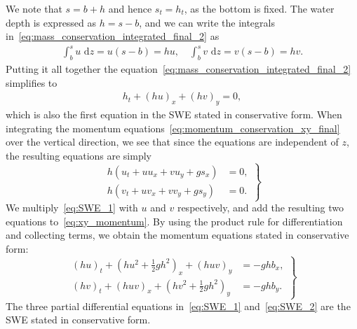 We note that $s = b + h$ and hence $s_t = h_t$, as the bottom is fixed.
The water depth is expressed as $h = s - b$, and we can write the integrals in~\eqref{eq:mass_conservation_integrated_final_2} as
\begin{align*}
    \int_{b}^{s} u \text{ d} z = u(s - b) = hu, \quad \int_{b}^{s} v \text{ d} z = v(s - b) = hv.
\end{align*}
Putting it all together the equation~\eqref{eq:mass_conservation_integrated_final_2} simplifies to
\begin{align}\label{eq:SWE_1}
    h_t + {(hu)}_x + {(hv)}_y = 0,
\end{align}
which is also the first equation in the SWE stated in conservative form.
When integrating the momentum equations~\eqref{eq:momentum_conservation_xy_final} over the vertical direction, we see that since the equations are independent of $z$, the resulting equations are simply
\begin{equation}\label{eq:xy_momentum}
    \left.
    \begin{aligned}
        h(u_t + uu_x + vu_y + g s_x) &= 0,\\
        h(v_t + uv_x + vv_y + g s_y) &= 0.
    \end{aligned}
    \right\}
\end{equation}
We multiply~\eqref{eq:SWE_1} with $u$ and $v$ respectively, and add the resulting two equations to~\eqref{eq:xy_momentum}.
By using the product rule for differentiation and collecting terms, we obtain the momentum equations stated in conservative form:
\begin{equation}\label{eq:SWE_2}
    \left.
    \begin{aligned}
        {(hu)}_t + {(hu^2 + \frac{1}{2}gh^2)}_x + {(huv)}_y &= -gh b_x,\\
        {(hv)}_t + {(huv)}_x + {(hv^2 + \frac{1}{2}gh^2)}_y &= -gh b_y.
    \end{aligned}
    \right\}
\end{equation}
The three partial differential equations in~\eqref{eq:SWE_1} and~\eqref{eq:SWE_2} are the SWE stated in conservative form.

